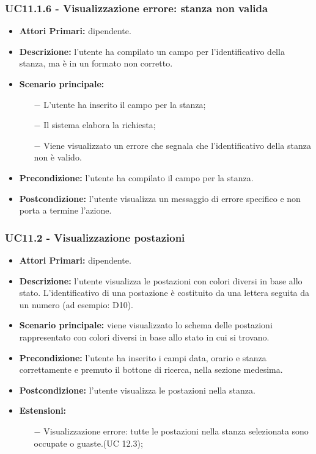 \subsubsection{ UC11.1.6 - Visualizzazione errore: stanza non valida }
\begin{itemize}
	\item\textbf{Attori Primari:} dipendente.
\item\textbf{Descrizione:} l’utente ha compilato un campo per l'identificativo della stanza, ma è in un formato non corretto.
\item\textbf{Scenario principale:} 
\begin{itemize}
	\item[$-$] L’utente ha inserito il campo per la stanza;
	\item[$-$] Il sistema elabora la richiesta;
	\item[$-$] Viene visualizzato un errore che segnala che l'identificativo della stanza non è valido.
\end{itemize}
\item\textbf{Precondizione:} l’utente ha compilato il campo per la stanza.
\item\textbf{Postcondizione:} l’utente visualizza un messaggio di errore specifico e non porta a termine l’azione.
\end{itemize}
\subsubsection{ UC11.2 - Visualizzazione postazioni  }
\begin{itemize}
	\item\textbf{Attori Primari:} dipendente.
	\item\textbf{Descrizione:} l’utente visualizza le postazioni con colori diversi in base allo stato. L'identificativo di una postazione è costituito da una lettera seguita da un numero (ad esempio: D10). 
	\item\textbf{Scenario principale:} viene visualizzato lo schema delle postazioni rappresentato con colori diversi in base allo stato in cui si trovano.
	\item\textbf{Precondizione:} l’utente ha inserito i campi data, orario e stanza correttamente e premuto il bottone di ricerca, nella sezione 
	medesima.
	\item\textbf{Postcondizione:} l’utente visualizza le postazioni nella stanza.
	\item\textbf{Estensioni:}
	\begin{itemize}
		\item[$-$] Visualizzazione errore: tutte le postazioni nella stanza selezionata sono occupate o guaste.(UC 12.3);
	\end{itemize}
\end{itemize}
